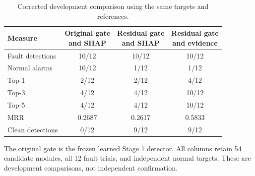 \begin{table}[htbp]
\centering\footnotesize
\caption{Corrected development comparison using the same targets and references.}
\label{tab:s_dev}
\renewcommand{\arraystretch}{1.15}
\setlength{\tabcolsep}{4pt}
\begin{tabular}{lccc}
\toprule
Measure & \shortstack{Original gate\\and SHAP} & \shortstack{Residual gate\\and SHAP} & \shortstack{Residual gate\\and evidence}\\
\midrule
Fault detections & 10/12 & 10/12 & 10/12\\
Normal alarms & 10/12 & 1/12 & 1/12\\
Top-1 & 2/12 & 2/12 & 4/12\\
Top-3 & 4/12 & 4/12 & 10/12\\
Top-5 & 4/12 & 4/12 & 10/12\\
MRR & 0.2687 & 0.2617 & 0.5833\\
Clean detections & 0/12 & 9/12 & 9/12\\
\bottomrule
\end{tabular}
\par\smallskip\parbox{0.98\linewidth}{\scriptsize The original gate is the frozen learned Stage 1 detector. All columns retain 54 candidate modules, all 12 fault trials, and independent normal targets. These are development comparisons, not independent confirmation.}
\end{table}
